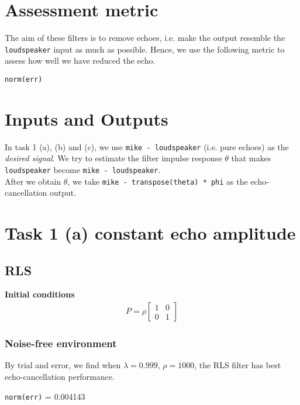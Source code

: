\documentclass{article}
\begin{document}
\section*{Assessment metric}
The aim of these filters is to remove echoes, i.e. make the output resemble the \texttt{loudspeaker} input as much as possible. Hence, we use the following metric to assess how well we have reduced the echo.
\begin{center}
\texttt{norm(err)}
\end{center}

\section*{Inputs and Outputs}
In task 1 (a), (b) and (c), we use \texttt{mike - loudspeaker} (i.e. pure echoes) as the \textit{desired signal}. We try to estimate the filter impulse response $\theta$ that makes \texttt{loudspeaker} become \texttt{mike - loudspeaker}.\\

After we obtain $\theta$, we take \texttt{mike - transpose(theta) * phi} as the echo-cancellation output.


\section*{Task 1 (a) constant echo amplitude}

\subsection*{RLS}

\textbf{Initial conditions}
\begin{align*}
P = \rho
\begin{bmatrix}
1 &0\\
0 &1
\end{bmatrix}
\end{align*}

\subsubsection*{Noise-free environment}
By trial and error, we find when $\lambda = 0.999$, $\rho = 1000$, the RLS filter has best echo-cancellation performance.
\begin{center}
\texttt{norm(err)} = 0.004143
\end{center}
\end{document}
